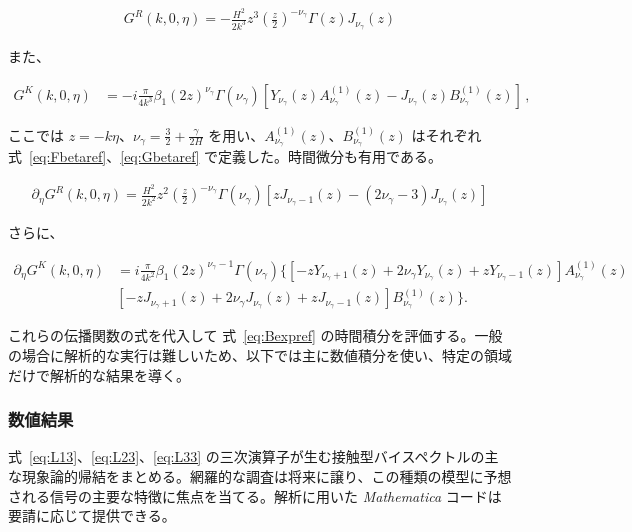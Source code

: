 \documentclass[a4paper,11pt]{ltjsarticle}
\numberwithin{equation}{section}
\newcommand{\Eq}[1]{Eq.~(\ref{#1})}
\newcommand{\Eqs}[1]{Eqs.~(\ref{#1})}
\renewcommand{\Eq}[1]{式~\eqref{#1}}
\renewcommand{\Eqs}[1]{式~\eqref{#1}}
\begin{document}
\begin{align}\label{eq:GRB2b}
    G^R(k, 0, \eta) = -\frac{H^2}{2k^3}  z^{3} \left(\frac{z}{2} \right)^{ - \nu_\gamma}\Gamma(z) J_{\nu_\gamma}(z)
\end{align}

また、

\begin{align}
    G^K(k, 0,\eta) &= - i\frac{\pi}{4k^3} \beta_1 \left(2 z \right)^{\nu_\gamma} \Gamma(\nu_\gamma) \left[ Y_{\nu_\gamma}(z)A^{(1)}_{\nu_\gamma}(z)- J_{\nu_\gamma}(z)B^{(1)}_{\nu_\gamma}(z)\right]\,,
\end{align}

ここでは $z=-k\eta$、$\nu_\gamma=\frac32+\frac{\gamma}{2H}$ を用い、$A^{(1)}_{\nu_\gamma}(z)$、$B^{(1)}_{\nu_\gamma}(z)$ はそれぞれ \Eqs{eq:Fbetaref}、\eqref{eq:Gbetaref} で定義した。時間微分も有用である。

\begin{align}
    \partial_\eta G^R(k, 0,\eta) = \frac{H^2}{2k^2} z^2 \left(\frac{z}{2} \right)^{-\nu_\gamma} \Gamma (\nu_\gamma) \left[ z J_{\nu_\gamma -1}(z)- (2 \nu_\gamma-3) J_{\nu_\gamma}(z)\right]
\end{align}

さらに、

\begin{align}
    \partial_\eta G^K(k, 0,\eta)&= i\frac{\pi}{4k^2}\beta_1\left(2 z \right)^{\nu_\gamma-1} \Gamma(\nu_\gamma)  \bigg\{\left[-z Y_{\nu_\gamma+1}(z)+2\nu_\gamma Y_{\nu_\gamma}(z) + z Y_{\nu_\gamma-1}(z)\right]A^{(1)}_{\nu_\gamma}(z) \nonumber \\
    & \left[-z J_{\nu_\gamma+1}(z)+2\nu_\gamma J_{\nu_\gamma}(z) + z J_{\nu_\gamma-1}(z)\right]B^{(1)}_{\nu_\gamma}(z)\bigg\}.
\end{align}

これらの伝播関数の式を代入して \Eq{eq:Bexpref} の時間積分を評価する。一般の場合に解析的な実行は難しいため、以下では主に数値積分を使い、特定の領域だけで解析的な結果を導く。

\subsubsection*{数値結果}

\Eqs{eq:L13}、\eqref{eq:L23}、\eqref{eq:L33} の三次演算子が生む接触型バイスペクトルの主な現象論的帰結をまとめる。網羅的な調査は将来に譲り、この種類の模型に予想される信号の主要な特徴に焦点を当てる。解析に用いた \textit{Mathematica} コードは要請に応じて提供できる。
\end{document}
